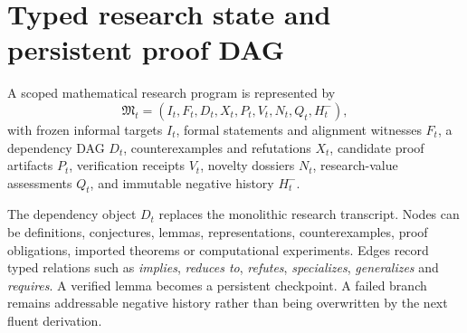 \section{Typed research state and persistent proof DAG}

A scoped mathematical research program is represented by
\[
\mathfrak M_t=(I_t,F_t,D_t,X_t,P_t,V_t,N_t,Q_t,H^-_t),
\]
with frozen informal targets $I_t$, formal statements and alignment witnesses $F_t$, a dependency DAG $D_t$, counterexamples and refutations $X_t$, candidate proof artifacts $P_t$, verification receipts $V_t$, novelty dossiers $N_t$, research-value assessments $Q_t$, and immutable negative history $H^-_t$.

The dependency object $D_t$ replaces the monolithic research transcript. Nodes can be definitions, conjectures, lemmas, representations, counterexamples, proof obligations, imported theorems or computational experiments. Edges record typed relations such as \emph{implies}, \emph{reduces to}, \emph{refutes}, \emph{specializes}, \emph{generalizes} and \emph{requires}. A verified lemma becomes a persistent checkpoint. A failed branch remains addressable negative history rather than being overwritten by the next fluent derivation.
